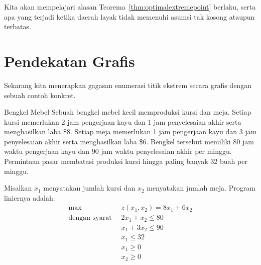Kita akan mempelajari alasan Teorema~\ref{thm:optimalextremepoint} berlaku, serta apa yang terjadi ketika daerah layak tidak memenuhi asumsi tak kosong ataupun terbatas.

\section{Pendekatan Grafis}\label{sec:graphical-approach}
Sekarang kita menerapkan gagasan enumerasi titik ekstrem secara grafis dengan sebuah contoh konkret.

\begin{example}{Bengkel Mebel}\label{ex:FurnitureWorkshop}
Sebuah bengkel mebel kecil memproduksi kursi dan meja. Setiap kursi memerlukan 2 jam pengerjaan kayu dan 1 jam penyelesaian akhir serta menghasilkan laba \$8. Setiap meja memerlukan 1 jam pengerjaan kayu dan 3 jam penyelesaian akhir serta menghasilkan laba \$6. Bengkel tersebut memiliki 80 jam waktu pengerjaan kayu dan 90 jam waktu penyelesaian akhir per minggu. Permintaan pasar membatasi produksi kursi hingga paling banyak 32 buah per minggu.

Misalkan $x_1$ menyatakan jumlah kursi dan $x_2$ menyatakan jumlah meja. Program liniernya adalah:
\begin{equation}
\begin{aligned}
\max\;\;& z(x_1,x_2) = 8x_1 + 6x_2\\
\text{dengan syarat}\;\;&  2x_1 + x_2 \leq 80\\
& x_1 + 3x_2 \leq 90\\
& x_1 \leq 32\\
& x_1 \geq 0\\
& x_2 \geq 0
\end{aligned}
\label{eqn:FurnitureWorkshop}
\end{equation}
\end{example}

